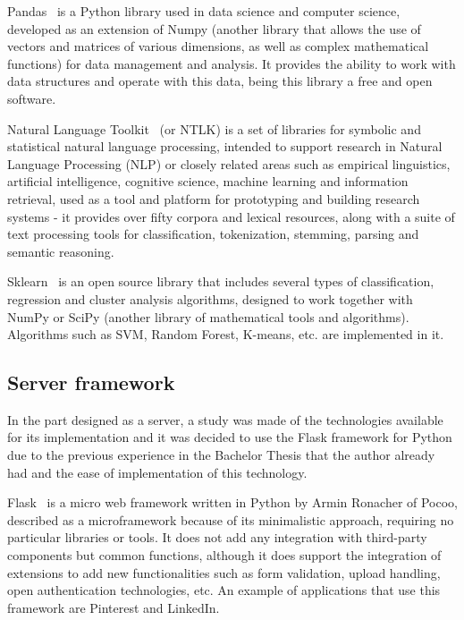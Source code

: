 Pandas~\cite{pandasPy20:online} is a Python library used in data science and computer science, developed as an extension of Numpy (another library that allows the use of vectors and matrices of various dimensions, as well as complex mathematical functions) for data management and analysis. It provides the ability to work with data structures and operate with this data, being this library a free and open software.

Natural Language Toolkit~\cite{NLTKNatu6:online} (or NTLK) is a set of libraries for symbolic and statistical natural language processing, intended to support research in Natural Language Processing (NLP) or closely related areas such as empirical linguistics, artificial intelligence, cognitive science, machine learning and information retrieval, used as a tool and platform for prototyping and building research systems - it provides over fifty corpora and lexical resources, along with a suite of text processing tools for classification, tokenization, stemming, parsing and semantic reasoning.

Sklearn~\cite{scikitle66:online} is an open source library that includes several types of classification, regression and cluster analysis algorithms, designed to work together with NumPy or SciPy (another library of mathematical tools and algorithms). Algorithms such as SVM, Random Forest, K-means, etc. are implemented in it.


\subsection{Server framework}
In the part designed as a server, a study was made of the technologies available for its implementation and it was decided to use the Flask framework for Python due to the previous experience in the Bachelor Thesis that the author already had and the ease of implementation of this technology.

Flask~\cite{Welcomet8:online} is a micro web framework written in Python by Armin Ronacher of Pocoo, described as a microframework because of its minimalistic approach, requiring no particular libraries or tools. It does not add any integration with third-party components but common functions, although it does support the integration of extensions to add new functionalities such as form validation, upload handling, open authentication technologies, etc. An example of applications that use this framework are Pinterest and LinkedIn.


